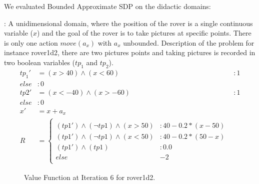 We evaluated Bounded Approximate SDP on the didactic domains:

\MarsRoverUni:
A unidimensional domain, where the position of the rover is a single continuous variable ($x$) and the goal of the rover is to take pictures at specific points. There is only one action $ move(a_x)$ with $a_x$ unbounded.
Description of the problem for instance rover1d2, there are two pictures points and taking pictures is recorded in two boolean variables ($tp_1$ and $tp_2$).
{\footnotesize
\begin{align*}
tp_1' &= 
(x>40) \wedge (x<60) &: 1\\
else &: 0\\
tp2' &= 
(x<-40) \wedge (x>-60) &: 1\\
else &: 0\\
x' &= x +a_x\\
R & = \begin{cases} \\
(tp1') \wedge (\neg tp1) \wedge (x > 50) &: 40 - 0.2*(x -50)\\
(tp1') \wedge (\neg tp1) \wedge (x < 50) &: 40 - 0.2*(50-x)\\
(tp1') \wedge ( tp1) &:  0.0\\
else & -2\\
\end{cases} &
\end{align*}}

\begin{figure}[h!t]
\center
{}
\caption{Value Function at Iteration 6 for rover1d2.}
\label{steplin} 
\end{figure}



